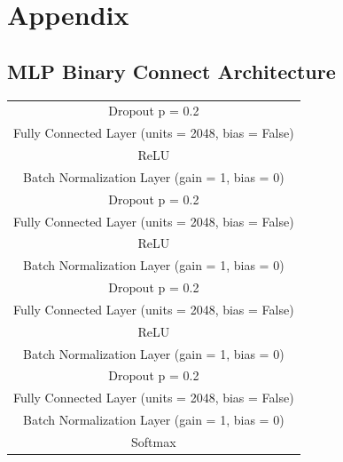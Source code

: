 \newpage
\section*{Appendix}
\subsection*{MLP Binary Connect Architecture}
\begin{table}[h]
\begin{center}
\begin{tabular}{  c  }
\hline
   Dropout p = 0.2 \\ 
   Fully Connected Layer (units = 2048, bias = False) \\
   ReLU \\
   Batch Normalization Layer (gain = 1, bias = 0)  \\ \hline
   Dropout p = 0.2 \\ 
   Fully Connected Layer (units = 2048, bias = False)  \\
   ReLU  \\
   Batch Normalization Layer (gain = 1, bias = 0) \\ \hline
   Dropout p = 0.2 \\ 
   Fully Connected Layer (units = 2048, bias = False) \\
   ReLU  \\
   Batch Normalization Layer (gain = 1, bias = 0) \\ \hline
   Dropout p = 0.2 \\ 
   Fully Connected Layer (units = 2048, bias = False)  \\
   Batch Normalization Layer (gain = 1, bias = 0)  \\ 
   Softmax  \\\hline
\end{tabular}
\end{center}
\end{table}

